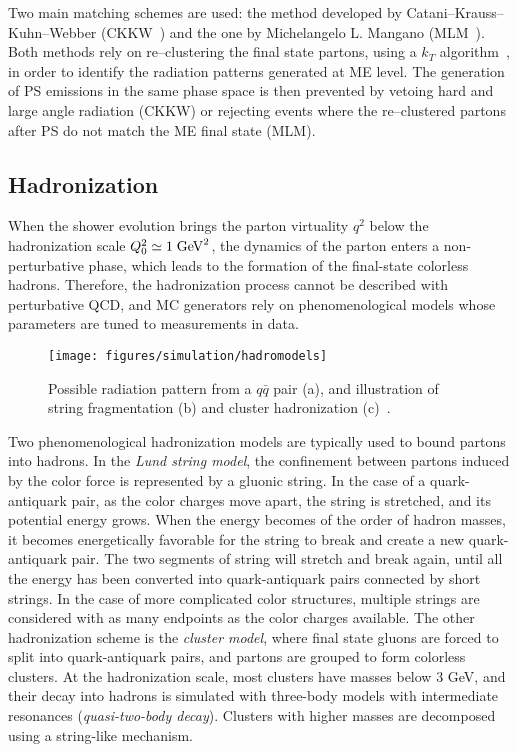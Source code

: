 Two main matching schemes are used: the method developed by
Catani--Krauss--Kuhn--Webber (CKKW~\cite{Catani:2001cc}) and the one by
Michelangelo L. Mangano (MLM~\cite{Mangano:2006rw}).
Both methods rely on re--clustering the final state partons, using a
$k_T$ algorithm~\cite{Catani:1991hj}, in order to identify the
radiation patterns generated at ME level. The generation of PS
emissions in the same phase space is then prevented by vetoing hard
and large angle radiation (CKKW) or rejecting events where the
re--clustered partons after PS do not match the ME final state (MLM).

\subsection{Hadronization}
\label{sec:hadronization}

When the shower evolution brings the parton virtuality $q^2$ below the
hadronization scale $Q_0^2\simeq1\; \mathrm{GeV}^2$, the dynamics of the parton
enters a non-perturbative phase, which leads to the formation of the
final-state colorless hadrons. Therefore, the hadronization process cannot
be described with perturbative QCD, and MC generators rely on
phenomenological models whose parameters are tuned to measurements in
data.

\begin{figure}[ht]
  \begin{center}
    \texttt{[image: figures/simulation/hadromodels]}
    \caption[Hadronization models]{
      Possible radiation pattern from a $q\bar{q}$ pair (a), and
      illustration of string fragmentation (b) and cluster
      hadronization (c)~\cite{mangano2005}.}
    \label{fig:hadronization}
  \end{center}
\end{figure}

Two phenomenological hadronization models are typically used to bound
partons into hadrons.
In the {\it Lund string model}, the confinement between partons
induced by the color force is represented by a gluonic string. In the
case of a quark-antiquark pair, as the color charges move apart, the
string is stretched, and its potential energy grows. When the energy
becomes of the order of hadron masses, it becomes energetically
favorable for the string to break and create a new quark-antiquark
pair. The two segments of string will stretch and break again, until
all the energy has been converted into quark-antiquark pairs connected
by short strings. In the case of more complicated color structures,
multiple strings are considered with as many endpoints as the color
charges available.
The other hadronization scheme is the {\it cluster model}, where
final state gluons are forced to split into quark-antiquark pairs,
and partons are grouped to form colorless clusters.
At the hadronization scale, most clusters have masses below $3$ GeV, and
their decay into hadrons is simulated with three-body models with
intermediate resonances ({\it quasi-two-body decay}). 
Clusters with higher masses are decomposed using a string-like
mechanism.

